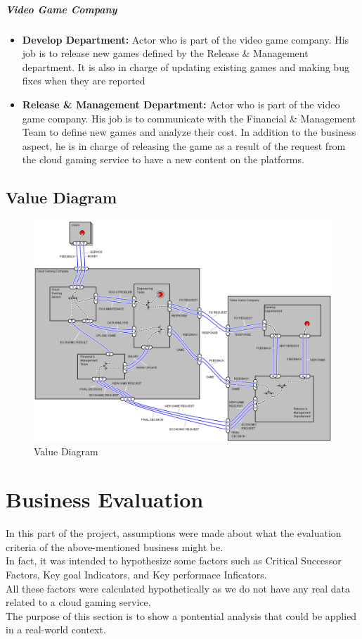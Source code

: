 \documentclass[a4paper,12pt]{report}
\begin{document}
\paragraph*{Video Game Company}
\begin{itemize}
\item{\textbf{Develop Department:} Actor who is part of the video game company.
His job is to release new games defined by the Release \& Management department. It is also in charge of updating existing games and making bug fixes when they are reported } 
%
\item{\textbf{Release \& Management Department:}  Actor who is part of the video game company.
His job is to communicate with the Financial \& Management Team to define new games and analyze their cost. In addition to the business aspect, he is in charge of releasing the game as a result of the request from the cloud gaming service to have a new content on the platforms.
} 
\end{itemize}
\section{Value Diagram}

\begin{figure}[H]
 \centering
\includegraphics[scale=0.45]{value_model}
\caption{Value Diagram}
\label{Value Diagramn }
\end{figure} 

\chapter{Business Evaluation}
In this part of the project, assumptions were made about what the evaluation criteria of the above-mentioned business might be. \\
In fact, it was intended to hypothesize some factors such as Critical Successor Factors, Key goal Indicators, and Key performace Inficators. \\
All these factors were calculated hypothetically as we do not have any real data related to a cloud gaming service. \\
The purpose of this section is to show a pontential analysis that could be applied in a real-world context. 
\end{document}
